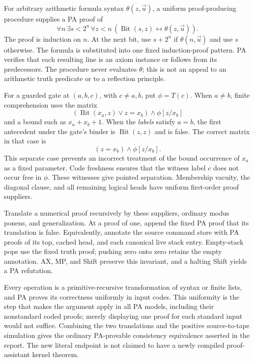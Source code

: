 For arbitrary arithmetic formula syntax $\theta(z,\vec u)$, a uniform
proof-producing procedure supplies a PA proof of
\[
 \forall n\,\exists s<2^n\,\forall z<n\,
      (\operatorname{Bit}(s,z)\leftrightarrow\theta(z,\vec u)).
\]
The proof is induction on $n$. At the next bit, use $s+2^n$ if
$\theta(n,\vec u)$ and use $s$ otherwise. The formula is substituted
into one fixed induction-proof pattern. PA verifies that each resulting
line is an axiom instance or follows from its predecessors. The procedure
never evaluates $\theta$; this is not an appeal to an arithmetic truth
predicate or to a reflection principle.

For a guarded gate at $(a,b,c)$, with $c\ne a,b$, put $\phi=T(c)$.
When $a\ne b$, finite comprehension uses the matrix
\[
 (\operatorname{Bit}(x_a,z)\lor z=x_b)\wedge\phi[z/x_b]
\]
and a bound such as $x_a+x_b+1$. When the \emph{labels} satisfy $a=b$,
the first antecedent under the gate's binder is
$\operatorname{Bit}(z,z)$ and is false. The correct matrix in that case is
\[
                         (z=x_b)\wedge\phi[z/x_b].
\]
This separate case prevents an incorrect treatment of the bound
occurrence of $x_a$ as a fixed parameter. Code freshness ensures that
the witness label $c$ does not occur free in $\phi$. These witnesses give
pointed separation. Membership vacuity, the diagonal clause, and all
remaining logical heads have uniform first-order proof suppliers.

Translate a numerical proof recursively by these suppliers, ordinary
modus ponens, and generalization. At a proof of one, append the fixed
PA proof that its translation is false. Equivalently, annotate the
source command store with PA proofs of its top, cached head, and each
canonical live stack entry. Empty-stack pops use the fixed truth proof;
pushing zero onto zero retains the empty annotation. AX, MP, and Shift
preserve this invariant, and a halting Shift yields a PA refutation.

Every operation is a primitive-recursive transformation of syntax or
finite lists, and PA proves its correctness uniformly in input codes.
This uniformity is the step that makes the argument apply in all PA
models, including their nonstandard coded proofs; merely displaying
one proof for each standard input would not suffice. Combining the two
translations and the positive source-to-tape simulation gives the
ordinary PA-provable consistency equivalence asserted in the report.
The new literal endpoint is not claimed to have a newly compiled
proof-assistant kernel theorem.
